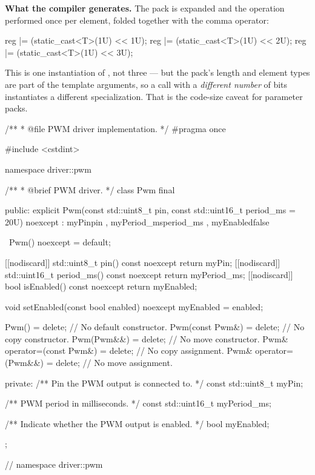 \medskip
\textbf{What the compiler generates.} The pack is expanded and the operation performed once per
element, folded together with the comma operator:

\begin{cppcode}
reg |= (static_cast<T>(1U) << 1U);
reg |= (static_cast<T>(1U) << 2U);
reg |= (static_cast<T>(1U) << 3U);
\end{cppcode}

\noindent This is one instantiation of , not three --- but the pack's length and element
types are part of the template arguments, so a call with a \emph{different number} of bits
instantiates a different specialization. That is the code-size caveat for parameter packs.


\begin{cppcode}
/**
 * @file PWM driver implementation.
 */
#pragma once

#include <cstdint>

namespace driver::pwm
{
/**
 * @brief PWM driver.
 */
class Pwm final
{
public:
    explicit Pwm(const std::uint8_t pin, const std::uint16_t period_ms = 20U) noexcept
        : myPin{pin}
        , myPeriod_ms{period_ms}
        , myEnabled{false}
    {}

    ~Pwm() noexcept = default;

    [[nodiscard]] std::uint8_t pin() const noexcept { return myPin; }
    [[nodiscard]] std::uint16_t period_ms() const noexcept { return myPeriod_ms; }
    [[nodiscard]] bool isEnabled() const noexcept { return myEnabled; }

    void setEnabled(const bool enabled) noexcept { myEnabled = enabled; }

    Pwm()                      = delete; // No default constructor.
    Pwm(const Pwm&)            = delete; // No copy constructor.
    Pwm(Pwm&&)                 = delete; // No move constructor.
    Pwm& operator=(const Pwm&) = delete; // No copy assignment.
    Pwm& operator=(Pwm&&)      = delete; // No move assignment.

private:
    /** Pin the PWM output is connected to. */
    const std::uint8_t myPin;

    /** PWM period in milliseconds. */
    const std::uint16_t myPeriod_ms;

    /** Indicate whether the PWM output is enabled. */
    bool myEnabled;
};
} // namespace driver::pwm
\end{cppcode}

